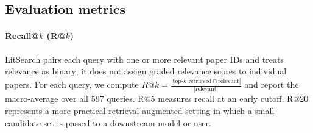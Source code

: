 \documentclass[pdflatex,sn-basic,Numbered]{sn-jnl}%
\theoremstyle{thmstyleone}%
\theoremstyle{thmstyletwo}%
\theoremstyle{thmstylethree}%
\begin{document}
\begin{table}[t]


  \centering
  \scriptsize
  \setlength{\tabcolsep}{3.5pt}
  \renewcommand{\arraystretch}{1.05}
  
  
  \caption{Validation of our LitSearch metric script against the retrieval-only
  results reported by Ajith et al.~\cite{Ajith}. Values are percentages. IB/IS
  denote inline broad/specific queries, while AB/AS denote author-written
  broad/specific queries.}
\label{tab:litsearch-metric-validation}
\end{table}

\subsection{Evaluation metrics}

\paragraph{Recall@$k$ (R@$k$)} LitSearch pairs each query with one or more
relevant paper IDs and treats relevance as binary; it does not assign graded
relevance scores to individual papers. For each query, we compute
\(
R@k = \frac{|\text{top-}k \text{ retrieved} \cap \text{relevant}|}{|\text{relevant}|}
\)
and report the macro-average over all 597 queries. R@5 measures recall at an early
cutoff. R@20 represents a more practical retrieval-augmented setting in which a
small candidate set is passed to a downstream model or user.
\end{document}
